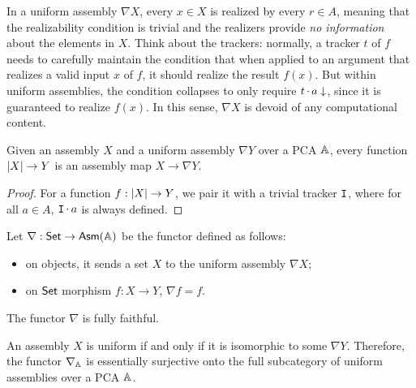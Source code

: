 In a uniform assembly \(\nabla X\), every \(x \in X\) is realized by every \(r \in A\), meaning that the realizability condition is trivial and the realizers provide \emph{no information} about the elements in \(X\).  Think about the trackers: normally, a tracker \(t\) of \(f\) needs to carefully maintain the condition that when applied to an argument that realizes a valid input \(x\) of \(f\), it should realize the result \(f(x)\).  But within uniform assemblies, the condition collapses to only require \(t \mathop\cdot\nolimits a \downarrow\), since it is guaranteed to realize \(f(x)\).  In this sense, \(\nabla X\) is devoid of any computational content.

\begin{proposition}
    \label{prop:set-func-asm-map}
    Given an assembly \(X\) and a uniform assembly \(\nabla Y\) over a PCA \(\mathbb{A}\), every function \(\vert X \vert \rightarrow Y\) is an assembly map \(X \rightarrow \nabla Y\).
\end{proposition}

\begin{proof}
    For a function \(f : \vert X \vert \rightarrow Y\), we pair it with a trivial tracker \(\mathtt{I}\), where for all \(a \in A\), \(\mathtt{I} \mathop\cdot\nolimits a\) is always defined.
\end{proof}

\begin{definition}
    Let \(\nabla : \mathsf{Set} \rightarrow \mathsf{Asm}(\mathbb{A})\) be the functor defined as follows:
    \begin{itemize}
        \item on objects, it sends a set \(X\) to the uniform assembly \(\nabla X\);
        \item on \(\mathsf{Set}\) morphism \(f : X \rightarrow Y\), \(\nabla f = f\).
    \end{itemize}
\end{definition}

\begin{proposition}
    The functor \(\nabla\) is fully faithful.
\end{proposition}

\begin{proposition}
    An assembly \(X\) is uniform if and only if it is isomorphic to some \(\nabla Y\).  Therefore, the functor \(\nabla_{\mathbb{A}}\) is essentially surjective onto the full subcategory of uniform assemblies over a PCA \(\mathbb{A}\).
\end{proposition}

